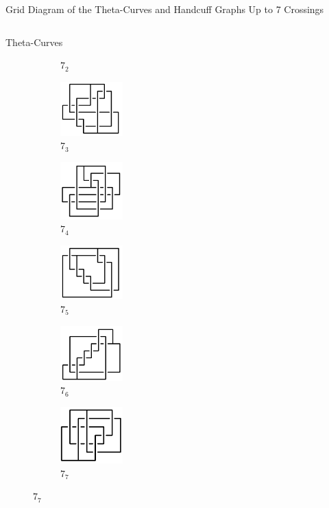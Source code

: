 \documentclass[final]{beamer}
\begin{document}
\begin{frame}[t]
\begin{alertblock}{Grid Diagram of the Theta-Curves and Handcuff Graphs Up to 7 Crossings}
\begin{columns}[t]
\begin{column}{0.6\textwidth}
\begin{alertblock}{Theta-Curves}
\begin{figure}
\begin{subfigure}{0.075\textwidth}
    \caption{$7_{2}$} 
    \end{subfigure}
    \begin{subfigure}{0.075\textwidth}
    \includegraphics[width=2.4cm]{../Midterm_Poster/grid_diagram/theta_7_3.png}
    \caption{$7_{3}$} 
    \end{subfigure}
    \begin{subfigure}{0.075\textwidth}
    \includegraphics[width=2.4cm]{../Midterm_Poster/grid_diagram/theta_7_4.png}
    \caption{$7_{4}$} 
    \end{subfigure}
    \begin{subfigure}{0.075\textwidth}
    \includegraphics[width=2.4cm]{../Midterm_Poster/grid_diagram/theta_7_5.png}
    \caption{$7_{5}$} 
    \end{subfigure}
    \begin{subfigure}{0.075\textwidth}
    \includegraphics[width=2.4cm]{../Midterm_Poster/grid_diagram/theta_7_6.png}
    \caption{$7_{6}$} 
    \end{subfigure}
    \begin{subfigure}{0.075\textwidth}
    \includegraphics[width=2.4cm]{../Midterm_Poster/grid_diagram/theta_7_7.png}
    \caption{$7_{7}$} 
    \end{subfigure}

\end{figure}
\end{alertblock}
\end{column}
\end{columns}
\end{alertblock}
\end{frame}
\end{document}
